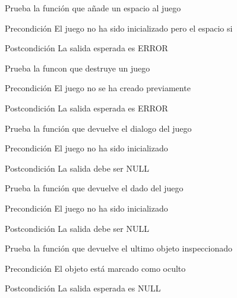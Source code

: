 \begin{DoxyRefList}
\item[\label{test__test000072}%
\hypertarget{test__test000072}{}%
Global \hyperlink{game__test_8c_aed0f40f3ab1c252e548b038542d7409d}{test2\-\_\-game\-\_\-add\-\_\-space} ()]Prueba la función que añade un espacio al juego \begin{DoxyPrecond}{Precondición}
El juego no ha sido inicializado pero el espacio si 
\end{DoxyPrecond}
\begin{DoxyPostcond}{Postcondición}
La salida esperada es E\-R\-R\-O\-R  
\end{DoxyPostcond}

\item[\label{test__test000062}%
\hypertarget{test__test000062}{}%
Global \hyperlink{game__test_8c_a91a33a9fce738616f2140d06a6ff079f}{test2\-\_\-game\-\_\-destroy} ()]Prueba la funcon que destruye un juego \begin{DoxyPrecond}{Precondición}
El juego no se ha creado previamente 
\end{DoxyPrecond}
\begin{DoxyPostcond}{Postcondición}
La salida esperada es E\-R\-R\-O\-R  
\end{DoxyPostcond}

\item[\label{test__test000112}%
\hypertarget{test__test000112}{}%
Global \hyperlink{game__test_8c_a6dd749417f3dc760da0f18714b0621a7}{test2\-\_\-game\-\_\-get\-\_\-dialogue} ()]Prueba la función que devuelve el dialogo del juego \begin{DoxyPrecond}{Precondición}
El juego no ha sido inicializado 
\end{DoxyPrecond}
\begin{DoxyPostcond}{Postcondición}
La salida debe ser N\-U\-L\-L  
\end{DoxyPostcond}

\item[\label{test__test000096}%
\hypertarget{test__test000096}{}%
Global \hyperlink{game__test_8c_ab3759124bfbaa5786661be7d353d15f1}{test2\-\_\-game\-\_\-get\-\_\-die} ()]Prueba la función que devuelve el dado del juego \begin{DoxyPrecond}{Precondición}
El juego no ha sido inicializado 
\end{DoxyPrecond}
\begin{DoxyPostcond}{Postcondición}
La salida debe ser N\-U\-L\-L  
\end{DoxyPostcond}

\item[\label{test__test000104}%
\hypertarget{test__test000104}{}%
Global \hyperlink{game__test_8c_ad61210e772ac8cec0196182f0a95a0a5}{test2\-\_\-game\-\_\-get\-\_\-last\-\_\-inspected\-\_\-object} ()]Prueba la función que devuelve el ultimo objeto inspeccionado \begin{DoxyPrecond}{Precondición}
El objeto está marcado como oculto 
\end{DoxyPrecond}
\begin{DoxyPostcond}{Postcondición}
La salida esperada es N\-U\-L\-L  
\end{DoxyPostcond}


\end{DoxyRefList}
